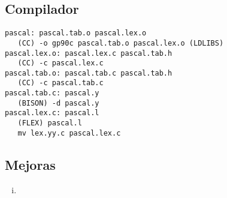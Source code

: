 \documentclass{beamer}
\theoremstyle{definition}
\theoremstyle{remark}
\begin{document}
\subsection{Compilador}
\begin{frame}
\texttt{pascal:	pascal.tab.o pascal.lex.o\\
\ \ \ (CC) -o gp90c pascal.tab.o pascal.lex.o (LDLIBS)\\
pascal.lex.o:	pascal.lex.c pascal.tab.h\\
\ \ \ (CC) -c pascal.lex.c\\
pascal.tab.o:	pascal.tab.c pascal.tab.h\\
\ \ \ (CC) -c pascal.tab.c\\ 
pascal.tab.c:	pascal.y\\
\ \ \ (BISON) -d pascal.y\\
pascal.lex.c:	pascal.l\\
\ \ \ (FLEX) pascal.l\\
\ \ \ mv  lex.yy.c pascal.lex.c
}

 
\end{frame}

\subsection{Mejoras}


\begin{frame}
\begin{enumerate}[i.]
\item 
\end{enumerate}

\end{frame}
\end{document}
